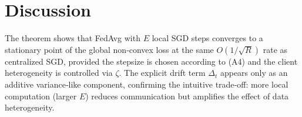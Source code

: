 \documentclass{article}
\begin{document}
\section*{Discussion}
The theorem shows that FedAvg with $E$ local SGD steps converges to a stationary point of the global non‑convex loss at the same $O(1/\sqrt{R})$ rate as centralized SGD, provided the stepsize is chosen according to (A4) and the client heterogeneity is controlled via $\zeta$. The explicit drift term $\Delta_t$ appears only as an additive variance‑like component, confirming the intuitive trade‑off: more local computation (larger $E$) reduces communication but amplifies the effect of data heterogeneity.
\end{document}
